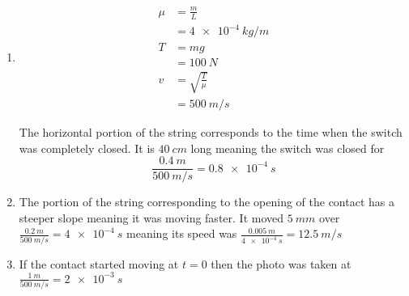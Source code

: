 \documentclass{article}
\begin{document}
\setcounter{subsection}{15}
\subsection{}

\begin{enumerate}
  \item

        \begin{align*}
          \mu & = \frac{m}{L}          \\
              & = \qty{4e-4}{kg/m}     \\
          T   & = m g                  \\
              & = \qty{100}{N}         \\
          v   & = \sqrt{\frac{T}{\mu}} \\
              & = \qty{500}{m/s}
        \end{align*}

        The horizontal portion of the string corresponds to the time when the switch was completely closed. It is $\qty{40}{cm}$ long meaning the switch was closed for \[\frac{\qty{0.4}{m}}{\qty{500}{m/s}} = \qty{0.8e-4}{s}\]

        \setcounter{enumi}{2}
  \item The portion of the string corresponding to the opening of the contact has a steeper slope meaning it was moving faster. It moved $\qty{5}{mm}$ over $\frac{\qty{0.2}{m}}{\qty{500}{m/s}} = \qty{4e-4}{s}$ meaning its speed was $\frac{\qty{0.005}{m}}{\qty{4e-4}{s}} = \qty{12.5}{m/s}$

  \item If the contact started moving at $t = 0$ then the photo was taken at $\frac{\qty{1}{m}}{\qty{500}{m/s}} = \qty{2e-3}{s}$
\end{enumerate}

\subsection{}
\end{document}
